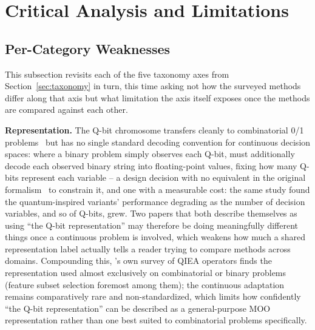 \section{Critical Analysis and Limitations}
\label{sec:critical-analysis}

\subsection{Per-Category Weaknesses}
\label{sec:critical-analysis:per-category}

This subsection revisits each of the five taxonomy axes from
Section~\ref{sec:taxonomy} in turn, this time asking not how the
surveyed methods differ along that axis but what limitation the axis
itself exposes once the methods are compared against each other.

\textbf{Representation.} The Q-bit chromosome transfers cleanly to
combinatorial 0/1 problems~\citep{kim2006qmea} but has no single
standard decoding convention for continuous decision spaces: where a
binary problem simply observes each Q-bit, \citet{olvera2023continuous}
must additionally decode each observed binary string into
floating-point values, fixing how many Q-bits represent each variable
-- a design decision with no equivalent in the original
formalism~\citep{han2002qea} to constrain it, and one with a measurable
cost: the same study found the quantum-inspired variants' performance
degrading as the number of decision variables, and so of Q-bits,
grew. Two papers that both
describe themselves as using ``the Q-bit representation'' may therefore
be doing meaningfully different things once a continuous problem is
involved, which weakens how much a shared representation label actually
tells a reader trying to compare methods across domains. Compounding
this, \citet{vivek2025fss}'s own survey of QIEA operators finds the
representation used almost exclusively on combinatorial or binary
problems (feature subset selection foremost among them); the continuous
adaptation remains comparatively rare and non-standardized, which limits
how confidently ``the Q-bit representation'' can be described as a
general-purpose MOO representation rather than one best suited to
combinatorial problems specifically.


